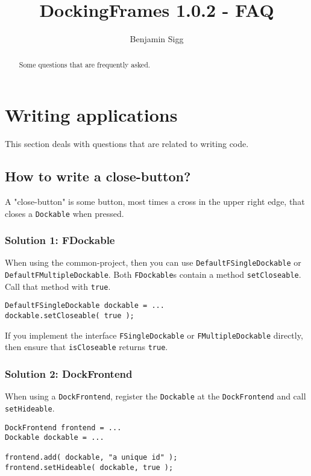\documentclass[a4paper,10pt]{article}
\title{DockingFrames 1.0.2 - FAQ}
\author{Benjamin Sigg}
\newcommand{\src}[1]{\lstinline[basicstyle=\normalsize\ttfamily,keywordstyle=\normalsize\ttfamily,identifierstyle=\normalsize\ttfamily]|#1|}
\begin{document}
\maketitle
\tableofcontents
\newpage

\begin{abstract}Some questions that are frequently asked.
\end{abstract}

\section{Writing applications}
This section deals with questions that are related to writing code.
\subsection{How to write a close-button?}
A "close-button" is some button, most times a cross in the upper right edge, that closes a \src{Dockable} when pressed.
\subsubsection{Solution 1: FDockable}
When using the common-project, then you can use \src{DefaultFSingleDockable} or \src{DefaultFMultipleDockable}. Both \src{FDockable}s contain a method \src{setCloseable}. Call that method with \src{true}.
\begin{lstlisting}
DefaultFSingleDockable dockable = ...
dockable.setCloseable( true );
\end{lstlisting}
If you implement the interface \src{FSingleDockable} or \src{FMultipleDockable} directly, then ensure that \src{isCloseable} returns \src{true}.

\subsubsection{Solution 2: DockFrontend}
When using a \src{DockFrontend}, register the \src{Dockable} at the \src{DockFrontend} and call \src{setHideable}.
\begin{lstlisting}
DockFrontend frontend = ...
Dockable dockable = ...

frontend.add( dockable, "a unique id" );
frontend.setHideable( dockable, true );
\end{lstlisting}
\end{document}

